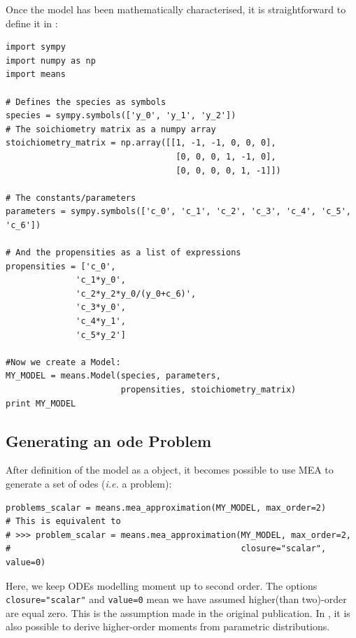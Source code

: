 Once the model has been mathematically characterised, it is straightforward to define it in \means:


\begin{framed}
\begin{verbatim}
import sympy
import numpy as np
import means

# Defines the species as symbols
species = sympy.symbols(['y_0', 'y_1', 'y_2'])
# The soichiometry matrix as a numpy array
stoichiometry_matrix = np.array([[1, -1, -1, 0, 0, 0],
                                  [0, 0, 0, 1, -1, 0],
                                  [0, 0, 0, 0, 1, -1]])

# The constants/parameters
parameters = sympy.symbols(['c_0', 'c_1', 'c_2', 'c_3', 'c_4', 'c_5', 'c_6'])

# And the propensities as a list of expressions
propensities = ['c_0',
              'c_1*y_0',
              'c_2*y_2*y_0/(y_0+c_6)',
              'c_3*y_0',
              'c_4*y_1',
              'c_5*y_2']

#Now we create a Model:
MY_MODEL = means.Model(species, parameters,
                       propensities, stoichiometry_matrix)
print MY_MODEL
\end{verbatim}
\end{framed}

\subsection{Generating an \gls{ode} Problem}
After definition of the model as a \py{} object, it becomes possible to use MEA to generate a set of \gls{ode}s (\emph{i.e.} a problem):


\begin{framed}
\begin{verbatim}
problems_scalar = means.mea_approximation(MY_MODEL, max_order=2)
# This is equivalent to
# >>> problem_scalar = means.mea_approximation(MY_MODEL, max_order=2,
#                                              closure="scalar", value=0)
\end{verbatim}
\end{framed}
Here, we keep ODEs modelling moment up to second order. The options \texttt{closure="scalar"} and \texttt{value=0} mean we have assumed higher(than two)-order are equal zero.
This is the assumption made in the original publication\cite{ale_general_2013}. In \means, it is also possible to derive higher-order moments from parametric distributions.

